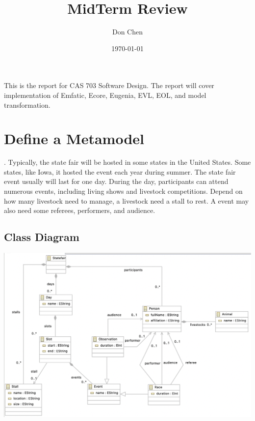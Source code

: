 \documentclass[12pt]{article}
\title{MidTerm Review}
\author{Don Chen}
\date{\today}
\begin{document}
\maketitle
This is the report for CAS 703 Software Design. The report will cover implementation of 
Emfatic, Ecore, Eugenia, EVL, EOL, and model transformation.

\section{Define a Metamodel}. 
Typically, the state fair will be hosted in some states in the United States. Some states, 
like Iowa, it hosted the event each year during summer. The state fair event usually will 
last for one day. During the day, participants can attend numerous events, including living shows 
and livestock competitions. Depend on how many livestock need to manage, a livestock need a stall 
to rest. A event may also need some referees, performers, and audience.

\subsection{Class Diagram}
\includegraphics[scale = 0.5]{img/statefair-diagram}
\end{document}
